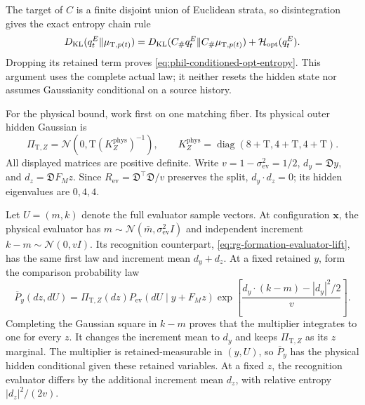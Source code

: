 The target of \(C\) is a finite disjoint union of Euclidean strata,
so disintegration gives the exact entropy chain rule
\begin{equation}
 D_{\mathrm{KL}}(q_t^E\Vert\mu_{\mathrm T,p(t)})
 =D_{\mathrm{KL}}(C_\#q_t^E\Vert C_\#\mu_{\mathrm T,p(t)})
                         +\mathcal H_{\mathrm{opt}}(q_t^E).
 \label{eq:phil-conditioned-parent-chain}
\end{equation}
Dropping its retained term proves
\cref{eq:phil-conditioned-opt-entropy}. This argument uses the
complete actual law; it neither resets the hidden state nor assumes
Gaussianity conditional on a source history.

For the physical bound, work first on one matching fiber. Its physical
outer hidden Gaussian is
\[
 \Pi_{\mathrm T,Z}=\mathcal N(0,\mathrm T(K_Z^{\mathrm{phys}})^{-1}),
 \qquad
 K_Z^{\mathrm{phys}}
  =\operatorname{diag}(8+\mathrm T,4+\mathrm T,4+\mathrm T).
\]
All displayed matrices are positive definite. Write
\(v=1-\sigma_{\mathrm{ev}}^2=1/2\),
\(d_y=\mathfrak Dy\), and \(d_z=\mathfrak DF_Mz\).
Since \(R_{\mathrm{ev}}=\mathfrak D^\top\mathfrak D/v\)
preserves the split, \(d_y\cdot d_z=0\); its hidden eigenvalues
are \(0,4,4\).

Let \(U=(m,k)\) denote the full evaluator sample vectors.
At configuration \(\mathbf x\), the physical evaluator has
\(m\sim\mathcal N(\bar m,\sigma_{\mathrm{ev}}^2I)\) and independent
increment \(k-m\sim\mathcal N(0,vI)\). Its recognition counterpart,
\cref{eq:rg-formation-evaluator-lift}, has the same first law and
increment mean \(d_y+d_z\). At a fixed retained \(y\), form the
comparison probability law
\begin{equation}
 \overline P_y(dz,dU)
 =\Pi_{\mathrm T,Z}(dz)P_{\mathrm{ev}}(dU\mid y+F_Mz)
  \exp\left[
  \frac{d_y\cdot(k-m)-|d_y|^2/2}{v}\right].
 \label{eq:phil-conditioned-evaluator-tilt}
\end{equation}
Completing the Gaussian square in \(k-m\) proves that the multiplier
integrates to one for every \(z\). It changes the increment mean
to \(d_y\) and keeps \(\Pi_{\mathrm T,Z}\) as its \(z\) marginal.
The multiplier is retained-measurable in \((y,U)\), so
\(\overline P_y\) has the physical hidden conditional given these
retained variables. At a fixed \(z\), the recognition evaluator
differs by the additional increment mean \(d_z\), with relative
entropy \(|d_z|^2/(2v)\).

